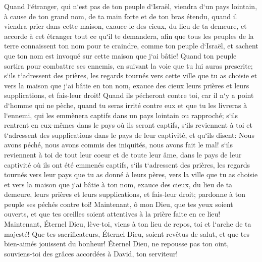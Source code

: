\verse Quand l`étranger, qui n`est pas de ton peuple d`Israël, viendra d`un pays lointain, à cause de ton grand nom, de ta main forte et de ton bras étendu, quand il viendra prier dans cette maison, 
\verse exauce-le des cieux, du lieu de ta demeure, et accorde à cet étranger tout ce qu`il te demandera, afin que tous les peuples de la terre connaissent ton nom pour te craindre, comme ton peuple d`Israël, et sachent que ton nom est invoqué sur cette maison que j`ai bâtie! 
\verse Quand ton peuple sortira pour combattre ses ennemis, en suivant la voie que tu lui auras prescrite; s`ils t`adressent des prières, les regards tournés vers cette ville que tu as choisie et vers la maison que j`ai bâtie en ton nom, 
\verse exauce des cieux leurs prières et leurs supplications, et fais-leur droit! 
\verse Quand ils pécheront contre toi, car il n`y a point d`homme qui ne pèche, quand tu seras irrité contre eux et que tu les livreras à l`ennemi, qui les emmènera captifs dans un pays lointain ou rapproché; 
\verse s`ils rentrent en eux-mêmes dans le pays où ils seront captifs, s`ils reviennent à toi et t`adressent des supplications dans le pays de leur captivité, et qu`ils disent: Nous avons péché, nous avons commis des iniquités, nous avons fait le mal! 
\verse s`ils reviennent à toi de tout leur coeur et de toute leur âme, dans le pays de leur captivité où ils ont été emmenés captifs, s`ils t`adressent des prières, les regards tournés vers leur pays que tu as donné à leurs pères, vers la ville que tu as choisie et vers la maison que j`ai bâtie à ton nom, 
\verse exauce des cieux, du lieu de ta demeure, leurs prières et leurs supplications, et fais-leur droit; pardonne à ton peuple ses péchés contre toi! 
\verse Maintenant, ô mon Dieu, que tes yeux soient ouverts, et que tes oreilles soient attentives à la prière faite en ce lieu! 
\verse Maintenant, Éternel Dieu, lève-toi, viens à ton lieu de repos, toi et l`arche de ta majesté! Que tes sacrificateurs, Éternel Dieu, soient revêtus de salut, et que tes bien-aimés jouissent du bonheur! 
\verse Éternel Dieu, ne repousse pas ton oint, souviens-toi des grâces accordées à David, ton serviteur! 

